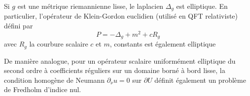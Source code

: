 \documentclass[memoire.tex]{subfiles}
\begin{document}
\begin{exemple}
    Si $g$ est une métrique riemannienne lisse, le laplacien $\Delta_g$ est elliptique. En particulier, l'opérateur de Klein-Gordon euclidien (utilisé en QFT relativiste) défini par
    \begin{equation*}
        P=-\Delta_g+m^2+cR_g
    \end{equation*}
    avec $R_g$ la courbure scalaire $c$ et $m$, constants est également elliptique
\end{exemple}
De manière analogue, pour un opérateur scalaire uniformément elliptique du second ordre à coefficients réguliers sur un domaine borné à bord lisse, la condition homogène de Neumann $\partial_\nu u=0$ sur $\partial U$ définit également un problème de Fredholm d'indice nul.
\newpage
\end{document}
